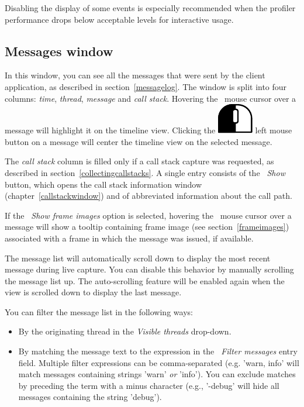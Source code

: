 \documentclass[hidelinks,titlepage,a4paper]{article}
\newcommand{\LMB}{\includegraphics[height=.8\baselineskip]{icons/lmb}}
\begin{document}
Disabling the display of some events is especially recommended when the profiler performance drops below acceptable levels for interactive usage.

\subsection{Messages window}
\label{messages}

In this window, you can see all the messages that were sent by the client application, as described in section~\ref{messagelog}. The window is split into four columns: \emph{time}, \emph{thread}, \emph{message} and \emph{call stack}. Hovering the \faMousePointer{}~mouse cursor over a message will highlight it on the timeline view. Clicking the \LMB{} left mouse button on a message will center the timeline view on the selected message.

The \emph{call stack} column is filled only if a call stack capture was requested, as described in section~\ref{collectingcallstacks}. A single entry consists of the \emph{\faAlignJustify{}~Show} button, which opens the call stack information window (chapter~\ref{callstackwindow}) and of abbreviated information about the call path.

If the \emph{\faImage{}~Show frame images} option is selected, hovering the \faMousePointer{}~mouse cursor over a message will show a tooltip containing frame image (see section~\ref{frameimages}) associated with a frame in which the message was issued, if available.

The message list will automatically scroll down to display the most recent message during live capture. You can disable this behavior by manually scrolling the message list up. The auto-scrolling feature will be enabled again when the view is scrolled down to display the last message.

You can filter the message list in the following ways:

\begin{itemize}
\item By the originating thread in the \emph{\faRandom{} Visible threads} drop-down.
\item By matching the message text to the expression in the \emph{\faFilter{}~Filter messages} entry field. Multiple filter expressions can be comma-separated (e.g. 'warn, info' will match messages containing strings 'warn' \emph{or} 'info'). You can exclude matches by preceding the term with a minus character (e.g., '-debug' will hide all messages containing the string 'debug').
\end{itemize}
\end{document}

